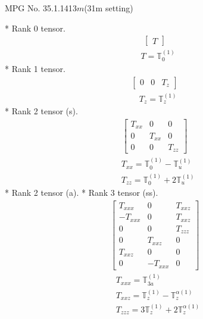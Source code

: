 \documentclass[fleqn,8pt,landscape]{jsarticle}
\begin{document}
\setcounter{MaxMatrixCols}{32}

\renewcommand{\tablename}{Table~}
\renewcommand{\figurename}{Figure~}
\begin{center}
\LARGE
MPG No. 35.1.141\quad$3m$\quad(31m setting)
\end{center}
* Rank 0 tensor.
\begin{align*}
\begin{bmatrix} T \end{bmatrix}
\end{align*}
\begin{align*}
& T = \mathbb{T}_{0}^{(1)}
\end{align*}
* Rank 1 tensor.
\begin{align*}
\begin{bmatrix} 0 & 0 & T_{z} \end{bmatrix}
\end{align*}
\begin{align*}
& T_{z} = \mathbb{T}_{z}^{(1)}
\end{align*}
* Rank 2 tensor (s).
\begin{align*}
\begin{bmatrix} T_{xx} & 0 & 0 \\ 0 & T_{xx} & 0 \\ 0 & 0 & T_{zz} \end{bmatrix}
\end{align*}
\begin{align*}
& T_{xx} = \mathbb{T}_{0}^{(1)} - \mathbb{T}_{u}^{(1)} \\
& T_{zz} = \mathbb{T}_{0}^{(1)} + 2 \mathbb{T}_{u}^{(1)}
\end{align*}
* Rank 2 tensor (a).
* Rank 3 tensor (ss).
\begin{align*}
\begin{bmatrix} T_{xxx} & 0 & T_{xxz} \\ - T_{xxx} & 0 & T_{xxz} \\ 0 & 0 & T_{zzz} \\ 0 & T_{xxz} & 0 \\ T_{xxz} & 0 & 0 \\ 0 & - T_{xxx} & 0 \end{bmatrix}
\end{align*}
\begin{align*}
& T_{xxx} = \mathbb{T}_{3a}^{(1)} \\
& T_{xxz} = \mathbb{T}_{z}^{(1)} - \mathbb{T}_{z}^{\alpha(1)} \\
& T_{zzz} = 3 \mathbb{T}_{z}^{(1)} + 2 \mathbb{T}_{z}^{\alpha(1)}
\end{align*}
\end{document}
